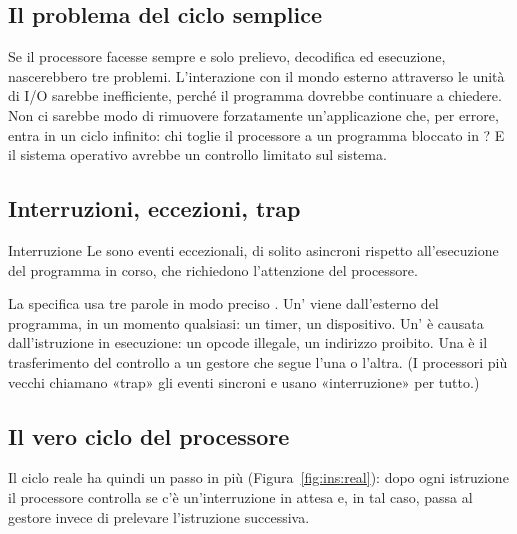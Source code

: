 \subsection{Il problema del ciclo semplice}

Se il processore facesse sempre e solo prelievo, decodifica ed esecuzione,
nascerebbero tre problemi. L'interazione con il mondo esterno attraverso le
unità di I/O sarebbe inefficiente, perché il programma dovrebbe continuare a
chiedere. Non ci sarebbe modo di rimuovere forzatamente un'applicazione che,
per errore, entra in un ciclo infinito: chi toglie il processore a un
programma bloccato in ? E il sistema operativo avrebbe un
controllo limitato sul sistema.

\subsection{Interruzioni, eccezioni, trap}

\begin{definition}{Interruzione}
Le  sono eventi eccezionali, di solito asincroni rispetto
all'esecuzione del programma in corso, che richiedono l'attenzione del
processore.
\end{definition}

La specifica \riscv usa tre parole in modo preciso \citep{riscvpriv}.
Un'  viene dall'esterno del programma, in un
momento qualsiasi: un timer, un dispositivo. Un' è causata
dall'istruzione in esecuzione: un opcode illegale, un indirizzo proibito. Una
 è il trasferimento del controllo a un gestore che segue l'una o
l'altra. (I processori più vecchi chiamano «trap» gli eventi sincroni e usano
«interruzione» per tutto.)

\subsection{Il vero ciclo del processore}

Il ciclo reale ha quindi un passo in più (Figura~\ref{fig:ins:real}): dopo
ogni istruzione il processore controlla se c'è un'interruzione in attesa e, in
tal caso, passa al gestore invece di prelevare l'istruzione successiva.

